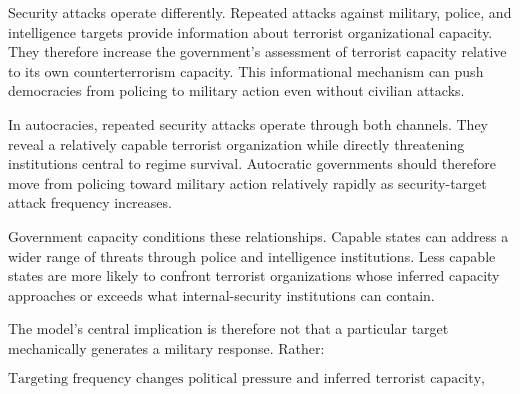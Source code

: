\documentclass[
  letterpaper,
  DIV=11,
  numbers=noendperiod]{scrartcl}
\begin{document}
Security attacks operate differently. Repeated attacks against military,
police, and intelligence targets provide information about terrorist
organizational capacity. They therefore increase the government's
assessment of terrorist capacity relative to its own counterterrorism
capacity. This informational mechanism can push democracies from
policing to military action even without civilian attacks.

In autocracies, repeated security attacks operate through both channels.
They reveal a relatively capable terrorist organization while directly
threatening institutions central to regime survival. Autocratic
governments should therefore move from policing toward military action
relatively rapidly as security-target attack frequency increases.

Government capacity conditions these relationships. Capable states can
address a wider range of threats through police and intelligence
institutions. Less capable states are more likely to confront terrorist
organizations whose inferred capacity approaches or exceeds what
internal-security institutions can contain.

The model's central implication is therefore not that a particular
target mechanically generates a military response. Rather:

\[
\boxed{
\text{Targeting frequency changes political pressure and inferred terrorist capacity, while government capacity determines whether those changes make military action preferable to policing.}
}
\]
\end{document}
